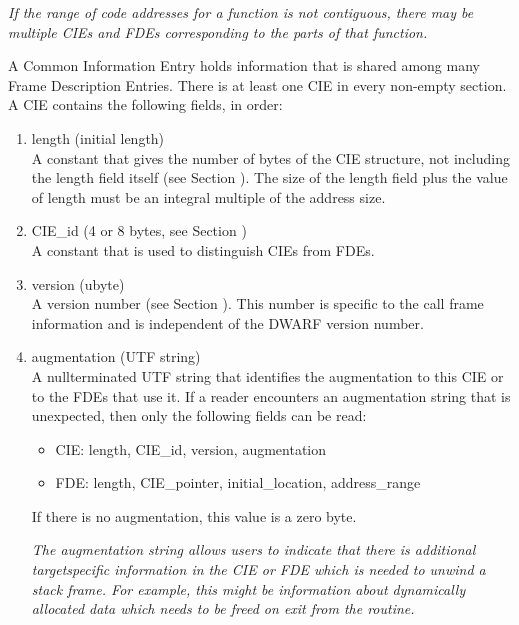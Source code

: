 \textit{If the range of code addresses for a function is not
contiguous, there may be multiple CIEs and FDEs corresponding
to the parts of that function.}


A Common Information Entry holds information that is shared
among many Frame Description Entries. There is at least one
CIE in every non-empty  section. A CIE contains
the following fields, in order:

\begin{enumerate}[1.]
\item length (initial length)  \\
A constant that gives the number of bytes of the CIE structure,
not including the length field itself 
(see Section ). 
The
size of the length field plus the value of length must be an
integral multiple of the address size.

\item  CIE\_id (4 or 8 bytes, see Section ) \\
A constant that is used to distinguish CIEs from FDEs.

\item  version (ubyte) \\
A version number 
(see Section ). 
This number is specific to the call frame information
and is independent of the DWARF version number.


\item  augmentation (UTF string) \\
A null\dash terminated UTF string that identifies the augmentation
to this CIE or to the FDEs that use it. If a reader encounters
an augmentation string that is unexpected, then only the
following fields can be read:


\begin{itemize}

\item CIE: length, CIE\_id, version, augmentation

\item FDE: length, CIE\_pointer, initial\_location, address\_range

\end{itemize}
If there is no augmentation, this value is a zero byte.

\textit{The augmentation string allows users to indicate that there
is additional target\dash specific information in the CIE or FDE
which is needed to unwind a stack frame. For example, this
might be information about dynamically allocated data which
needs to be freed on exit from the routine.}


\end{enumerate}
